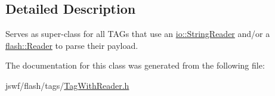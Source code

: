 \subsection{Detailed Description}
Serves as super-\/class for all {\ttfamily T\+A\+G}s that use an \hyperlink{classjswf_1_1io_1_1_string_reader}{io\+::\+String\+Reader} and/or a \hyperlink{classjswf_1_1flash_1_1_reader}{flash\+::\+Reader} to parse their payload. 

The documentation for this class was generated from the following file\+:\begin{DoxyCompactItemize}
\item 
jswf/flash/tags/\hyperlink{_tag_with_reader_8h}{Tag\+With\+Reader.\+h}\end{DoxyCompactItemize}
